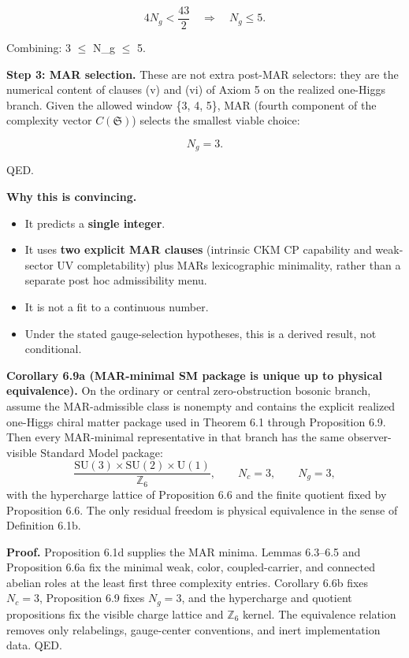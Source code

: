 \[
4 N_g < \frac{43}{2} \quad \Rightarrow \quad N_g \le 5.
\]

Combining: 3 \ensuremath{\leq} N\_g \ensuremath{\leq} 5.

\textbf{Step 3: MAR selection.} These are not extra post-MAR selectors: they are the numerical content of clauses (v) and (vi) of Axiom 5 on the realized one-Higgs branch. Given the allowed window \{3, 4, 5\}, MAR (fourth component of the complexity vector \(C(\mathfrak S)\)) selects the smallest viable choice:

\[
N_g = 3.
\]

QED.

\textbf{Why this is convincing.}

\begin{itemize}
\tightlist
\item
  It predicts a \textbf{single integer}.
\item
  It uses \textbf{two explicit MAR clauses} (intrinsic CKM CP capability and weak-sector UV completability) plus MAR\textquotesingle s lexicographic minimality, rather than a separate post hoc admissibility menu.
\item
  It is not a fit to a continuous number.
\item
  Under the stated gauge-selection hypotheses, this is a derived result, not conditional.
\end{itemize}

\textbf{Corollary 6.9a (MAR-minimal SM package is unique up to physical equivalence).} On the ordinary or central zero-obstruction bosonic branch, assume the MAR-admissible class is nonempty and contains the explicit realized one-Higgs chiral matter package used in Theorem 6.1 through Proposition 6.9. Then every MAR-minimal representative in that branch has the same observer-visible Standard Model package:
\[
\frac{\mathrm{SU}(3)\times\mathrm{SU}(2)\times\mathrm U(1)}{\mathbb Z_6},
\qquad
N_c=3,\qquad
N_g=3,
\]
with the hypercharge lattice of Proposition 6.6 and the finite quotient fixed by Proposition 6.6. The only residual freedom is physical equivalence in the sense of Definition 6.1b.

\textbf{Proof.} Proposition 6.1d supplies the MAR minima. Lemmas 6.3--6.5 and Proposition 6.6a fix the minimal weak, color, coupled-carrier, and connected abelian roles at the least first three complexity entries. Corollary 6.6b fixes \(N_c=3\), Proposition 6.9 fixes \(N_g=3\), and the hypercharge and quotient propositions fix the visible charge lattice and \(\mathbb Z_6\) kernel. The equivalence relation removes only relabelings, gauge-center conventions, and inert implementation data. QED.


